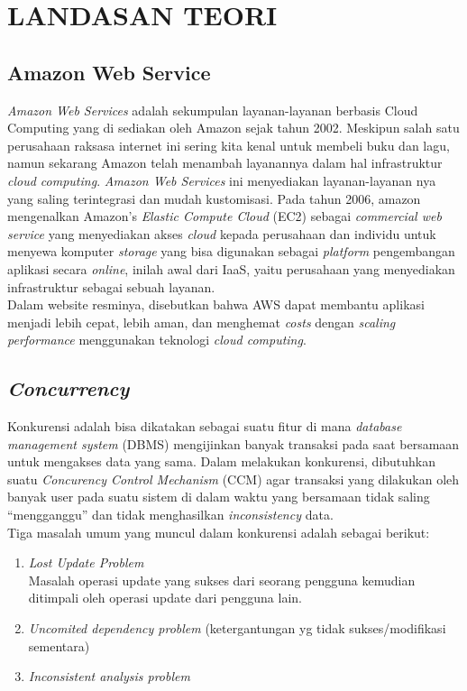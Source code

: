 	\chapter{LANDASAN TEORI}
	
	\section  {Amazon Web Service}
	\textit{Amazon Web Services }adalah sekumpulan layanan-layanan berbasis Cloud Computing yang di sediakan oleh Amazon sejak tahun 2002. Meskipun salah satu perusahaan raksasa internet ini sering kita kenal untuk membeli buku dan lagu, namun sekarang Amazon telah menambah layanannya dalam hal infrastruktur \textit{cloud computing}. \textit{Amazon Web Services} ini menyediakan layanan-layanan nya yang saling terintegrasi dan mudah kustomisasi. Pada tahun 2006, amazon mengenalkan Amazon’s \textit{Elastic Compute Cloud} (EC2) sebagai \textit{commercial \textit{web} service} yang menyediakan akses \textit{cloud} kepada perusahaan dan individu untuk menyewa komputer \textit{storage} yang bisa digunakan sebagai \textit{platform} pengembangan aplikasi secara \textit{online}, inilah awal dari IaaS, yaitu perusahaan yang menyediakan infrastruktur sebagai sebuah layanan\cite{wikipedia_amazon_2016}.
	\\ \indent
	Dalam website resminya, disebutkan bahwa AWS dapat membantu aplikasi menjadi lebih cepat, lebih aman, dan menghemat \textit{costs} dengan \textit{scaling} \textit{performance} menggunakan teknologi \textit{cloud computing}\cite{web_services_amazon_nodate}.
	
	\section{  \textit{Concurrency}}
	Konkurensi adalah bisa dikatakan sebagai suatu fitur di mana \textit{database management system} (DBMS) mengijinkan banyak transaksi pada saat bersamaan untuk mengakses data yang sama. Dalam melakukan konkurensi, dibutuhkan suatu \textit{Concurency Control Mechanism }(CCM) agar transaksi yang dilakukan oleh banyak user pada suatu sistem di dalam waktu yang bersamaan tidak saling “mengganggu” dan tidak menghasilkan \textit{inconsistency} data.
	\\ \indent
	Tiga masalah umum yang muncul dalam konkurensi adalah sebagai berikut: 
	\begin{enumerate}
	    	\item \textit{Lost Update Problem }\\ \indent Masalah operasi update yang sukses dari seorang pengguna kemudian ditimpali oleh operasi update dari pengguna lain.
	    	\item\textit{ Uncomited dependency problem } (ketergantungan yg tidak sukses/modifikasi sementara)
	    	\item \textit{Inconsistent analysis problem} \cite{noauthor_sistem_2013}
	\end{enumerate}   
	
